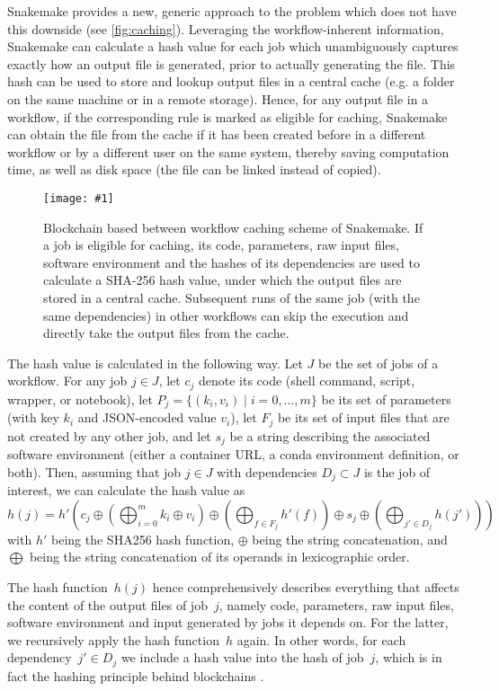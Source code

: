 \documentclass[parskip=half]{scrartcl}
\newcommand{\image}[1]{\centering\texttt{[image: \#1]}}
\begin{document}
Snakemake provides a new, generic approach to the problem which does not have this downside (see \autoref{fig:caching}).
Leveraging the workflow-inherent information, Snakemake can calculate a hash value for each job which unambiguously captures exactly how an output file is generated, prior to actually generating the file.
This hash can be used to store and lookup output files in a central cache (e.g. a folder on the same machine or in a remote storage).
Hence, for any output file in a workflow, if the corresponding rule is marked as eligible for caching, Snakemake can obtain the file from the cache if it has been created before in a different workflow or by a different user on the same system, thereby saving computation time, as well as disk space (the file can be linked instead of copied).

\begin{figure}
	\image{caching.pdf}
	\caption{
		Blockchain based between workflow caching scheme of Snakemake.
		If a job is eligible for caching, its code, parameters, raw input files, software environment and the hashes of its dependencies are used to calculate a SHA-256 hash value, under which the output files are stored in a central cache.
		Subsequent runs of the same job (with the same dependencies) in other workflows can skip the execution and directly take the output files from the cache.
	}
	\label{fig:caching}
\end{figure}

The hash value is calculated in the following way.
Let $J$ be the set of jobs of a workflow.
For any job $j \in J$, let $c_j$ denote its code (shell command, script, wrapper, or notebook), let $P_j = \{(k_i, v_i) \mid i=0,\dots,m\}$ be its set of parameters (with key $k_i$ and JSON-encoded value $v_i$), let $F_j$ be its set of input files that are not created by any other job, and let $s_j$ be a string describing the associated software environment (either a container URL, a conda environment definition, or both).
Then, assuming that job $j \in J$ with dependencies $D_j \subset J$ is the job of interest, we can calculate the hash value as $$ h(j) = h'\left( c_j \oplus \left(\bigoplus_{i=0}^m k_i \oplus v_i \right) \oplus \left( \bigoplus_{f \in F_j} h'(f) \right) \oplus s_j \oplus \left( \bigoplus_{j' \in D_j} h(j') \right) \right) $$ with $h'$ being the SHA256 \parencite{Handschuh} hash function, $\oplus$ being the string concatenation, and $\bigoplus$ being the string concatenation of its operands in lexicographic order.

The hash function~\(h(j)\) hence comprehensively describes everything that affects the content of the output files of job~\(j\), namely code, parameters, raw input files, software environment and input generated by jobs it depends on.
For the latter, we recursively apply the hash function~\(h\) again.
In other words, for each dependency~\(j' \in D_j\) we include a hash value into the hash of job~\(j\), which is in fact the hashing principle behind blockchains \parencite{narayanan_bitcoin_2016}.

\printbibliography
\end{document}
